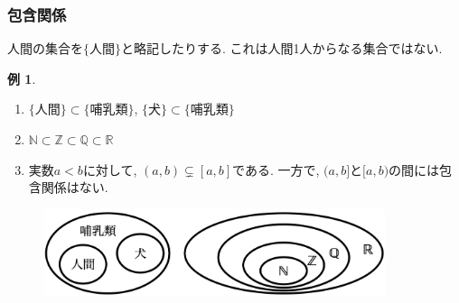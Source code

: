 \documentclass[dvipdfmx,cjk,10.2pt]{beamer}
\newcommand{\R}{\mathbb{R}}
\newcommand{\Q}{\mathbb{Q}}
\newcommand{\Z}{\mathbb{Z}}
\newcommand{\N}{\mathbb{N}}
\theoremstyle{definition}
\newtheorem{Ex}[Thm]{例}
\newtheorem{Def}[Thm]{定義}
\begin{document}
\begin{frame}
\frametitle{包含関係}   

人間の集合を$\{\text{人間}\}$と略記したりする. 
これは人間1人からなる集合ではない. 

\begin{Ex}
\begin{enumerate}
\item $\{\text{人間}\} \subset \{\text{哺乳類}\}$, $\{\text{犬}\} \subset \{\text{哺乳類}\}$
\item $\N \subset \Z \subset \Q \subset  \R$
\item 実数$a<b$に対して, $(a,b) \subsetneq [a,b]$である. 
一方で, $(a,b]$と$[a,b)$の間には包含関係はない. 
\end{enumerate} 
\end{Ex}


 \begin{figure}[htbp]
 \begin{center} 
  \includegraphics[width=100mm]{subsets.png}
 \end{center}
\end{figure}

\end{frame}





%
%
%
%
%
%
%
\end{document}
